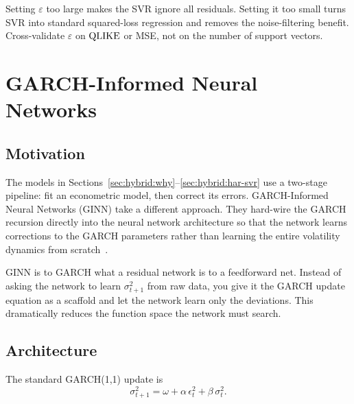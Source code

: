 \begin{warning}
Setting $\varepsilon$ too large makes the SVR ignore all residuals.
Setting it too small turns SVR into standard squared-loss regression and
removes the noise-filtering benefit.  Cross-validate $\varepsilon$ on
$\operatorname{QLIKE}$ or MSE, not on the number of support vectors.
\end{warning}


\section{GARCH-Informed Neural Networks}\label{sec:hybrid:ginn}

\subsection{Motivation}

The models in Sections~\ref{sec:hybrid:why}--\ref{sec:hybrid:har-svr} use
a two-stage pipeline: fit an econometric model, then correct its errors.
GARCH-Informed Neural Networks (GINN) take a different approach.
They hard-wire the GARCH recursion directly into the neural network
architecture so that the network learns corrections to the GARCH
parameters rather than learning the entire volatility dynamics from
scratch~\citep{GINN2024}.

\begin{keyidea}[GINN = Residual Learning for GARCH]
GINN is to GARCH what a residual network is to a feedforward net.
Instead of asking the network to learn $\sigma^2_{t+1}$ from raw data,
you give it the GARCH update equation as a scaffold and let the network
learn only the deviations.  This dramatically reduces the function space
the network must search.
\end{keyidea}

\subsection{Architecture}

The standard GARCH(1,1) update is
\begin{equation}\label{eq:garch-update}
  \sigma^2_{t+1} = \omega + \alpha\,\epsilon_t^2 + \beta\,\sigma^2_t.
\end{equation}

